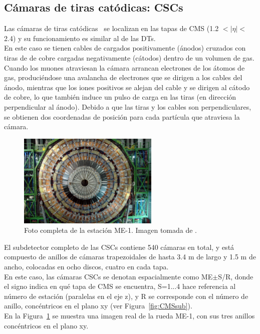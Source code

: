 \subsection{C\'amaras de tiras cat\'odicas: CSCs}\label{sec:CSCs}

Las c\'amaras de tiras cat\'odicas~\cite{CSCperformance} se localizan en las tapas de CMS (1.2 $< \lvert \eta \rvert <$ 2.4) y su funcionamiento es similar al de las DTs. \\
En este caso se tienen cables de cargados positivamente (\'anodos) cruzados con tiras de de cobre cargadas negativamente (c\'atodos) dentro de un volumen de gas. Cuando los muones atraviesan la c\'amara arrancan electrones de los \'atomos de gas, produci\'endose una avalancha de electrones que se dirigen a los cables del \'anodo, mientras que los iones positivos se alejan del cable y se dirigen al c\'atodo de cobre, lo que tambi\'en induce un pulso de carga en las tiras (en direcci\'on perpendicular al \'anodo). Debido a que las tiras y los cables son perpendiculares, se obtienen dos coordenadas de posici\'on para cada part\'icula que atraviesa la c\'amara. \\

\begin{figure}[h]
\centering
\includegraphics[width=0.60\textwidth]{figures/CSC_MEm1.jpg}
\caption{Foto completa de la estaci\'on ME-1. Imagen tomada de \cite{Breedon:1431505}.}
\label{fig:CSC_MEm1}        
\end{figure}


El subdetector completo de las CSCs contiene 540 c\'amaras en total, y est\'a compuesto de anillos de c\'amaras trapezoidales de hasta 3.4 m de largo y 1.5 m de ancho, colocadas en ocho discos, cuatro en cada tapa. \\
En este caso, las c\'amaras CSCs se denotan espacialmente como ME$\pm$S/R, donde el signo indica en qu\'e tapa de CMS se encuentra, S=1...4 hace referencia al n\'umero de estaci\'on (paralelas en el eje z), y R se corresponde con el n\'umero de anillo, conc\'entricos en el plano xy  (ver Figura~\ref{fig:CMSsub}). \\
En la Figura~\ref{fig:CSC_MEm1} se muestra una imagen real de la rueda ME-1, con sus tres anillos conc\'entricos en el plano xy. \\ 


